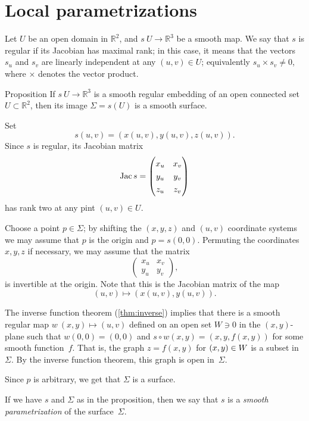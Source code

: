 \section{Local parametrizations}

Let $U$ be an open domain in $\mathbb{R}^2$, and $s\:U\to \mathbb{R}^3$ be a smooth map.
We say that $s$ is regular if its Jacobian has maximal rank;
in this case, it means that the vectors $s_u$ and $s_v$ are linearly independent at any $(u,v)\in U$;
equivalently $s_u\times s_v\ne 0$, where $\times$ denotes the vector product.

\begin{thm}{Proposition}\label{prop:graph-chart}
If $s\:U\to \mathbb{R}^3$ is a smooth regular embedding of an open connected set $U\subset \mathbb{R}^2$, then its image $\Sigma=s(U)$ is a smooth surface.
\end{thm}

Set 
\[s(u,v)=(x(u,v),y(u,v),z(u,v)).\]
Since $s$ is regular, its Jacobian matrix
\[\Jac s=
\renewcommand\arraystretch{1.3}
\begin{pmatrix}
x_u&x_v\\
y_u&y_v\\
z_u&z_v
\end{pmatrix}
\]
has rank two at any pint $(u,v)\in U$.

Choose a point $p\in \Sigma$; by shifting the $(x,y,z)$ and $(u,v)$ coordinate systems we may assume that $p$ is the origin and $p=s(0,0)$.
Permuting the coordinates $x,y,z$ if necessary, we may assume that 
the matrix 
\[
\renewcommand\arraystretch{1.3}
\begin{pmatrix}
x_u&x_v\\
y_u&y_v
\end{pmatrix},
\] 
is invertible at the origin.
Note that this is the Jacobian matrix of the map
\[(u,v)\mapsto (x(u,v),y(u,v)).\]

The inverse function theorem (\ref{thm:inverse}) implies that there is a smooth regular map
$w\:(x,y)\mapsto (u,v)$ defined on an open set $W\ni 0$ in the $(x,y)$-plane
such that $w(0,0)=(0,0)$ and  $s\circ w(x,y)=(x,y,f(x,y))$ for some smooth function~$f$.
That is, the graph $z=f(x,y)$ for $(x,y)\z\in W$ is a subset in~$\Sigma$.
By the inverse function theorem, this graph is open in~$\Sigma$.

Since $p$ is arbitrary, we get that $\Sigma$ is a surface.
\qeds

If we have $s$ and $\Sigma$ as in the proposition, then we say that $s$ is a \emph{smooth parametrization} of the surface~$\Sigma$. 

